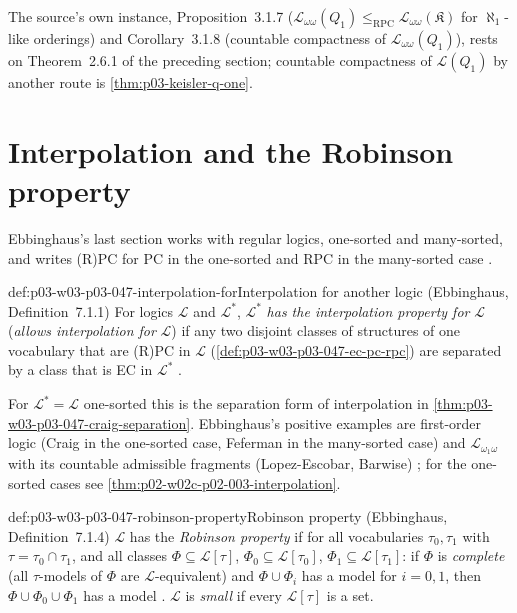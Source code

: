 The source's own instance, Proposition~3.1.7
(\(\mathscr L_{\omega\omega}(Q_1)\le_{\mathrm{RPC}}\mathscr L_{\omega\omega}(\mathfrak K)\)
for \(\aleph_1\)-like orderings) and Corollary~3.1.8 (countable compactness
of \(\mathscr L_{\omega\omega}(Q_1)\)), rests on Theorem~2.6.1 of the
preceding section; countable compactness of \(\mathscr L(Q_1)\) by another
route is \cref{thm:p03-keisler-q-one}.





\section{Interpolation and the Robinson property}
\label{sec:p03-w03-p03-047-robinson}

Ebbinghaus's last section works with regular logics, one-sorted and
many-sorted, and writes (R)PC for PC in the one-sorted and RPC in the
many-sorted case \cite[Ch.~II, \S7, p.~68]{Ebbinghaus1985ExtendedLogics}.

\begin{hbdefinition}{def:p03-w03-p03-047-interpolation-for}{Interpolation for another logic (Ebbinghaus, Definition~7.1.1)}
For logics \(\mathscr L\) and \(\mathscr L^\ast\), \(\mathscr L^\ast\)
\emph{has the interpolation property for} \(\mathscr L\) (\emph{allows
interpolation for} \(\mathscr L\)) if any two disjoint classes of
structures of one vocabulary that are (R)PC in \(\mathscr L\)
(\cref{def:p03-w03-p03-047-ec-pc-rpc}) are separated by a class that is EC
in \(\mathscr L^\ast\) \cite[Ch.~II, Definition~7.1.1, p.~68]{Ebbinghaus1985ExtendedLogics}.
\end{hbdefinition}

For \(\mathscr L^\ast=\mathscr L\) one-sorted this is the separation form of
interpolation in \cref{thm:p03-w03-p03-047-craig-separation}.  Ebbinghaus's
positive examples are first-order logic (Craig in the one-sorted case,
Feferman in the many-sorted case) and \(\mathscr L_{\omega_1\omega}\) with
its countable admissible fragments (Lopez-Escobar, Barwise)
\cite[Ch.~II, Examples~7.1.2, p.~68]{Ebbinghaus1985ExtendedLogics}; for the
one-sorted cases see \cref{thm:p02-w02c-p02-003-interpolation}.

\begin{hbdefinition}{def:p03-w03-p03-047-robinson-property}{Robinson property (Ebbinghaus, Definition~7.1.4)}
\(\mathscr L\) has the \emph{Robinson property} if for all vocabularies
\(\tau_0,\tau_1\) with \(\tau=\tau_0\cap\tau_1\), and all classes
\(\Phi\subseteq\mathscr L[\tau]\), \(\Phi_0\subseteq\mathscr L[\tau_0]\),
\(\Phi_1\subseteq\mathscr L[\tau_1]\): if \(\Phi\) is \emph{complete} (all
\(\tau\)-models of \(\Phi\) are \(\mathscr L\)-equivalent) and
\(\Phi\cup\Phi_i\) has a model for \(i=0,1\), then
\(\Phi\cup\Phi_0\cup\Phi_1\) has a model
\cite[Ch.~II, Definition~7.1.4, p.~70]{Ebbinghaus1985ExtendedLogics}.
\(\mathscr L\) is \emph{small} if every \(\mathscr L[\tau]\) is a set.
\end{hbdefinition}

